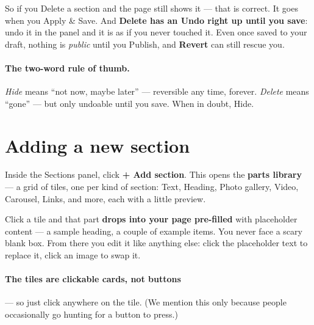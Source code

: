\documentclass[11pt]{article}
\begin{document}
So if you Delete a section and the page still shows it --- that is correct. It goes
when you Apply \& Save. And \textbf{Delete has an Undo right up until you save}: undo
it in the panel and it is as if you never touched it. Even once saved to your draft,
nothing is \emph{public} until you Publish, and \textbf{Revert} can still rescue you.

\paragraph{The two-word rule of thumb.} \emph{Hide} means ``not now, maybe later'' ---
reversible any time, forever. \emph{Delete} means ``gone'' --- but only undoable until
you save. When in doubt, Hide.

\section{Adding a new section}

Inside the Sections panel, click \textbf{+ Add section}. This opens the \textbf{parts
library} --- a grid of tiles, one per kind of section: Text, Heading, Photo gallery,
Video, Carousel, Links, and more, each with a little preview.

\begin{center}
\end{center}

Click a tile and that part \textbf{drops into your page pre-filled} with placeholder
content --- a sample heading, a couple of example items. You never face a scary blank
box. From there you edit it like anything else: click the placeholder text to replace
it, click an image to swap it.

\paragraph{The tiles are clickable cards, not buttons} --- so just click anywhere on
the tile. (We mention this only because people occasionally go hunting for a button to
press.)
\end{document}
